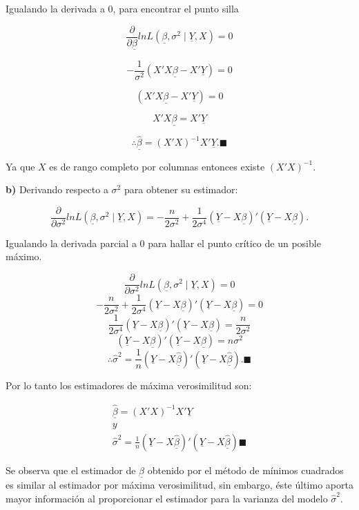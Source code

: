\documentclass[
  a4paper,
  oneside,
  openany]{book}
\begin{document}
Igualando la derivada a 0, para encontrar el punto silla

\[\frac{\partial}{\partial \underline{\beta}}lnL(\underline{\beta},\sigma^2 \mid \underline{Y},X)=0\]

\[-\frac{1}{\sigma^2}(X'X\underline{\beta}-X'\underline{Y})=0\]

\[(X'X\underline{\beta}-X'\underline{Y})=0\]

\[X'X\underline{\beta}=X'\underline{Y}\]

\[\therefore \underline{\hat{\beta}}=(X'X)^{-1}X'\underline{Y}. \blacksquare\]

Ya que \(X\) es de rango completo por columnas entonces existe \((X'X)^{-1}.\)

\textbf{b)} Derivando respecto a \(\sigma^2\) para obtener su estimador:

\[\frac{\partial}{\partial\sigma^2}lnL(\underline{\beta},\sigma^2 \mid \underline{Y},X)=-\frac{n}{2\sigma^2}+\frac{1}{2\sigma^4}(\underline{Y}-X\underline{\beta})'(\underline{Y}-X\underline{\beta}).\]

Igualando la derivada parcial a 0 para hallar el punto crítico de un posible máximo.

\[\frac{\partial}{\partial\sigma^2}lnL(\underline{\beta}, \sigma^2 \mid \underline{Y},X)=0\]
\[-\frac{n}{2\sigma^2}+\frac{1}{2\sigma^4}(\underline{Y}-X\underline{\beta})'(\underline{Y}-X\underline{\beta})=0\]
\[\frac{1}{2\sigma^4}(\underline{Y}-X\underline{\beta})'(\underline{Y}-X\underline{\beta})=\frac{n}{2\sigma^2}\]
\[(\underline{Y}-X\underline{\beta})'(\underline{Y}-X\underline{\beta})=n\sigma^2\]
\[\therefore \hat{\sigma}^2=\frac{1}{n}\left( \underline{Y}-X\underline{\hat{\beta}}\right)'\left(\underline{Y}-X \underline{\hat{\beta}}\right).\blacksquare\]

Por lo tanto los estimadores de máxima verosimilitud son:

\[
\begin{array}{c}
\underline{\hat{\beta}}=(X'X)^{-1}X'\underline{Y} \\
y \\
\hat{\sigma}^2=\frac{1}{n}\left( \underline{Y}-X\underline{\hat{\beta}}\right)'\left(\underline{Y}-X \underline{\hat{\beta}}\right) 
\blacksquare
\end{array}
\]

Se observa que el estimador de \(\underline{\beta}\) obtenido por el método de mínimos cuadrados es similar al estimador por máxima verosimilitud, sin embargo, éste último aporta mayor información al proporcionar el estimador para la varianza del modelo \(\hat{\sigma}^2.\)
\end{document}
